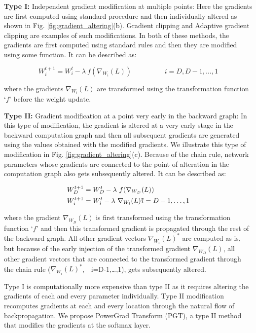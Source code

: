 \documentclass[runningheads]{llncs}
\begin{document}
\textbf{Type I:} Independent gradient modification at multiple points: Here the
gradients are first computed using standard procedure and then individually altered as
shown in Fig. \ref{fig:gradient_altering}(b). Gradient clipping
\cite{pascanu2013difficulty} and Adaptive gradient clipping \cite{brock2021high} are
examples of such modifications. In both of these methods, the gradients are first
computed using standard rules and then they are modified using some function. It can be
described as:

\begin{equation}
W_i^{t+1} = W_i^t - \lambda\ f(\nabla_{W_i}(L))
\hspace{2cm}
i=D,D-1,\ldots,1
\end{equation}

where the gradients $\nabla_{W_i}(L)$ are transformed using the transformation function
`$f$' before the weight update.

\textbf{Type II:} Gradient modification at a point very early in the backward graph: In
this type of modification, the gradient is altered at a very early stage in the backward
computation graph and then all subsequent gradients are generated using the values
obtained with the modified gradients. We illustrate this type of modification in Fig.
\ref{fig:gradient_altering}(c). Because of the chain rule, network parameters whose
gradients are connected to the point of alteration in the computation graph also gets
subsequently altered. It can be described as:

\begin{align}
W_D^{t+1} &= W_D^t - \lambda\ f(\nabla_{W_D}(L)) & \\
W_i^{t+1} &= W_i^t - \lambda\ \nabla_{W_i}(L)^{*} &\hspace{-1cm} i=D-1,\ldots,1
\end{align}

where the gradient $\nabla_{W_D}(L)$ is first transformed using the transformation
function `$f$' and then this transformed gradient is propagated through the rest of the
backward graph. All other gradient vectors $\nabla_{W_i}(L)^{*}$ are computed as is, but
because of the early injection of the transformed gradient $\nabla_{W_D}(L)$, all other
gradient vectors that are connected to the transformed gradient through the chain rule
($\nabla_{W_i}(L)^{*}$,\ \ i=D-1,\ldots,1), gets subsequently altered.

Type I is computationally more expensive than type II as it requires altering the
gradients of each and every parameter individually. Type II modification recomputes
gradients at each and every location through the natural flow of backpropagation. We
propose PowerGrad Transform (PGT), a type II method that modifies the gradients at the
softmax layer.
\end{document}
